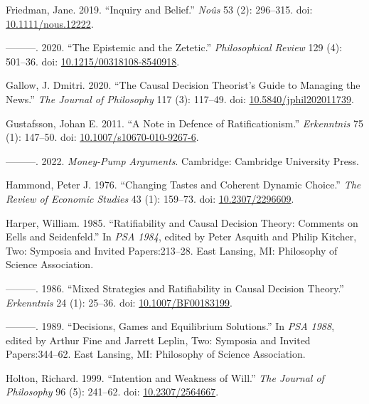 \documentclass[
  10pt,
  letterpaper,
  DIV=11,
  numbers=noendperiod,
  twoside]{scrartcl}
\newlength{\cslhangindent}
\newenvironment{CSLReferences}[2] %
 {\begin{list}{}{%
  \setlength{\itemindent}{0pt}
  \setlength{\leftmargin}{0pt}
  \setlength{\parsep}{0pt}
  \ifodd #1
   \setlength{\leftmargin}{\cslhangindent}
   \setlength{\itemindent}{-1\cslhangindent}
  \fi
  \setlength{\itemsep}{#2\baselineskip}}}
 {\end{list}}
\begin{document}
\begin{CSLReferences}{1}{0}
Friedman, Jane. 2019. {``Inquiry and Belief.''} \emph{No{û}s} 53 (2):
296--315. doi:
\href{https://doi.org/10.1111/nous.12222}{10.1111/nous.12222}.

---------. 2020. {``The Epistemic and the Zetetic.''}
\emph{Philosophical Review} 129 (4): 501--36. doi:
\href{https://doi.org/10.1215/00318108-8540918}{10.1215/00318108-8540918}.

Gallow, J. Dmitri. 2020. {``The Causal Decision Theorist's Guide to
Managing the News.''} \emph{The Journal of Philosophy} 117 (3): 117--49.
doi:
\href{https://doi.org/10.5840/jphil202011739}{10.5840/jphil202011739}.

Gustafsson, Johan E. 2011. {``A Note in Defence of Ratificationism.''}
\emph{Erkenntnis} 75 (1): 147--50. doi:
\href{https://doi.org/10.1007/s10670-010-9267-6}{10.1007/s10670-010-9267-6}.

---------. 2022. \emph{Money-Pump Arguments}. Cambridge: Cambridge
University Press.

Hammond, Peter J. 1976. {``Changing Tastes and Coherent Dynamic
Choice.''} \emph{The Review of Economic Studies} 43 (1): 159--73. doi:
\href{https://doi.org/10.2307/2296609}{10.2307/2296609}.

Harper, William. 1985. {``Ratifiability and Causal Decision Theory:
Comments on Eells and Seidenfeld.''} In \emph{PSA 1984}, edited by Peter
Asquith and Philip Kitcher, Two: Symposia and Invited Papers:213--28.
East Lansing, MI: Philosophy of Science Association.

---------. 1986. {``Mixed Strategies and Ratifiability in Causal
Decision Theory.''} \emph{Erkenntnis} 24 (1): 25--36. doi:
\href{https://doi.org/10.1007/BF00183199}{10.1007/BF00183199}.

---------. 1989. {``Decisions, Games and Equilibrium Solutions.''} In
\emph{PSA 1988}, edited by Arthur Fine and Jarrett Leplin, Two: Symposia
and Invited Papers:344--62. East Lansing, MI: Philosophy of Science
Association.

Holton, Richard. 1999. {``Intention and Weakness of Will.''} \emph{The
Journal of Philosophy} 96 (5): 241--62. doi:
\href{https://doi.org/10.2307/2564667}{10.2307/2564667}.


\end{CSLReferences}
\end{document}
